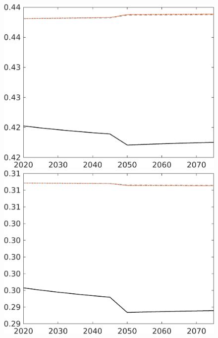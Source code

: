\begin{figure}[h!!]
\begin{minipage}[]{0.32\textwidth}
\end{minipage}
\begin{minipage}[]{0.32\textwidth}
\includegraphics[width=1\textwidth]{../../codding_model/own_basedOnFried/optimalPol_010922_revision/figures/all_13Sept22/CompRed_TaulCalib_hh_spillover0_knspil0_nsk0_xgr0_sep0_LFlimit1_emsbase0_countec0_GovRev0_etaa0.79_lgd0.png}
\end{minipage}
\begin{minipage}[]{0.32\textwidth}
\includegraphics[width=1\textwidth]{../../codding_model/own_basedOnFried/optimalPol_010922_revision/figures/all_13Sept22/CompRed_TaulCalib_hl_spillover0_knspil0_nsk0_xgr0_sep0_LFlimit1_emsbase0_countec0_GovRev0_etaa0.79_lgd0.png}

\end{minipage}
\end{figure}
